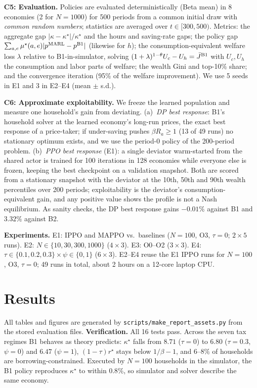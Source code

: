 \documentclass{article}
\begin{document}
\textbf{C5: Evaluation.} Policies are evaluated deterministically (Beta mean) in 8 economies (2 for $N=1000$) for 500 periods from a common initial draw with \emph{common random numbers}; statistics are averaged over $t\in[300,500)$. Metrics: the aggregate gap $|\kappa-\kappa^\star|/\kappa^\star$ and the hours and saving-rate gaps; the policy gap $\sum_{a,e}\mu^\star(a,e)|p^{\rm MARL}-p^{\rm B1}|$ (likewise for $h$); the consumption-equivalent welfare loss $\lambda$ relative to B1-in-simulator, solving $(1+\lambda)^{1-\theta}U_c-U_h=\bar J^{\rm B1}$ with $U_c,U_h$ the consumption and labor parts of welfare; the wealth Gini and top-10\% share; and the convergence iteration (95\% of the welfare improvement). We use 5 seeds in E1 and 3 in E2--E4 (mean $\pm$ s.d.).

\textbf{C6: Approximate exploitability.} We freeze the learned population and measure one household's gain from deviating. (a)~\emph{DP best response}: B1's household solver at the learned economy's long-run prices, the exact best response of a price-taker; if under-saving pushes $\beta R_a\ge1$ (13 of 49 runs) no stationary optimum exists, and we use the period-0 policy of the 200-period problem. (b)~\emph{PPO best response} (E1): a single deviator warm-started from the shared actor is trained for 100 iterations in 128 economies while everyone else is frozen, keeping the best checkpoint on a validation snapshot. Both are scored from a stationary snapshot with the deviator at the 10th, 50th and 90th wealth percentiles over 200 periods; exploitability is the deviator's consumption-equivalent gain, and any positive value shows the profile is not a Nash equilibrium. As sanity checks, the DP best response gains $-0.01\%$ against B1 and $3.32\%$ against B2.

\textbf{Experiments.} E1: IPPO and MAPPO vs.\ baselines ($N=100$, O3, $\tau=0$; $2\times5$ runs). E2: $N\in\{10,30,300,1000\}$ ($4\times3$). E3: O0--O2 ($3\times3$). E4: $\tau\in\{0.1,0.2,0.3\}\times\psi\in\{0,1\}$ ($6\times3$). E2--E4 reuse the E1 IPPO runs for $N=100$, O3, $\tau=0$; 49 runs in total, about 2 hours on a 12-core laptop CPU.

\section{Results}\label{sec:results}
All tables and figures are generated by \texttt{scripts/make\_report\_assets.py} from the stored evaluation files. \textbf{Verification.} All 16 tests pass. Across the seven tax regimes B1 behaves as theory predicts: $\kappa^\star$ falls from $8.71$ ($\tau=0$) to $6.80$ ($\tau=0.3$, $\psi=0$) and $6.47$ ($\psi=1$), $(1-\tau)r^\star$ stays below $1/\beta-1$, and $6$--$8\%$ of households are borrowing-constrained. Executed by $N=100$ households in the simulator, the B1 policy reproduces $\kappa^\star$ to within $0.8\%$, so simulator and solver describe the same economy.
\end{document}
